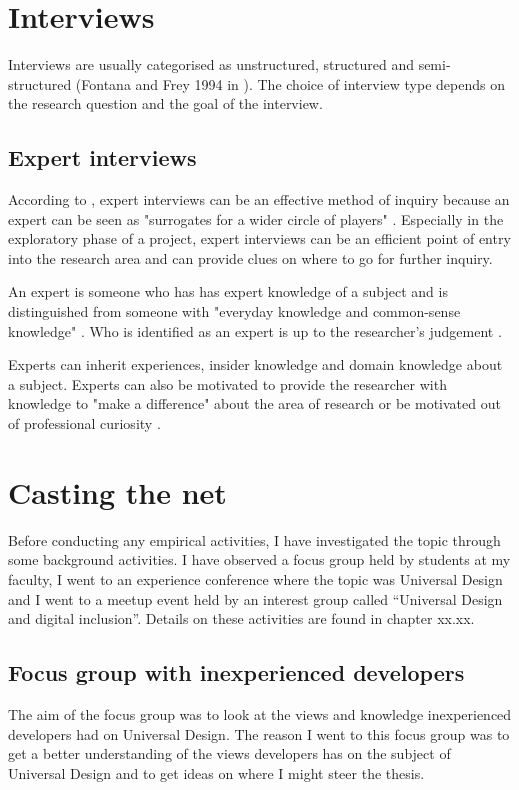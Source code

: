 \section{Interviews}
Interviews are usually categorised as unstructured, structured and semi-structured (Fontana and Frey 1994 in \cite{rogers_interaction_2011}). The choice of interview type depends on the research question and the goal of the interview.

\subsection{Expert interviews}
According to \citeauthor{meuser2009expert}, expert interviews can be an effective method of inquiry because an expert can be seen as "surrogates for a wider circle of players" \parencite[2]{meuser2009expert}. Especially in the exploratory phase of a project, expert interviews can be an efficient point of entry into the research area and can provide clues on where to go for further inquiry.  

An expert is someone who has has expert knowledge of a subject and is distinguished from someone with "everyday knowledge and common-sense knowledge" \parencite[18]{meuser2009expert}. Who is identified as an expert is up to the researcher's judgement \parencite{meuser2009expert}. 

Experts can inherit experiences, insider knowledge and domain knowledge about a subject. Experts can also be motivated to provide the researcher with knowledge to "make a difference" about the area of research or be motivated out of professional curiosity \parencite{meuser2009expert}.

\section{Casting the net}
Before conducting any empirical activities, I have investigated the topic through some background activities. I have observed a focus group held by students at my faculty, I went to an experience conference where the topic was Universal Design and I went to a meetup event held by an interest group called “Universal Design and digital inclusion”. Details on these activities are found in chapter xx.xx.

\subsection{Focus group with inexperienced developers}
The aim of the focus group was to look at the views and knowledge inexperienced developers had on Universal Design. The reason I went to this focus group was to get a better understanding of the views developers has on the subject of Universal Design and to get ideas on where I might steer the thesis.

